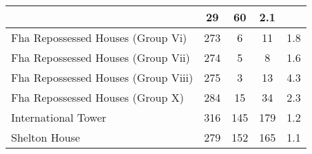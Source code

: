 \begin{tabular}{l|c|c|c|c|}
                                          & 29                                                           & 60                                                                & 2.1                                                                \\ \hline\multicolumn{1}{|l|}{\cellcolor{ccteallight}Fha Repossessed Houses (Group Vi)}        & 273                                                   & 6                                                           & 11                                                                & 1.8                                                                \\ \hline\multicolumn{1}{|l|}{\cellcolor{ccteallight}Fha Repossessed Houses (Group Vii)}        & 274                                                   & 5                                                           & 8                                                                & 1.6                                                                \\ \hline\multicolumn{1}{|l|}{\cellcolor{ccteallight}Fha Repossessed Houses (Group Viii)}        & 275                                                   & 3                                                           & 13                                                                & 4.3                                                                \\ \hline\multicolumn{1}{|l|}{\cellcolor{ccteallight}Fha Repossessed Houses (Group X)}        & 284                                                   & 15                                                           & 34                                                                & 2.3                                                                \\ \hline\multicolumn{1}{|l|}{\cellcolor{ccteallight}International Tower}        & 316                                                   & 145                                                           & 179                                                                & 1.2                                                                \\ \hline\multicolumn{1}{|l|}{\cellcolor{ccteallight}Shelton House}        & 279                                                   & 152                                                           & 165                                                                & 1.1                                                                \\ \hline
    \end{tabular}
    
